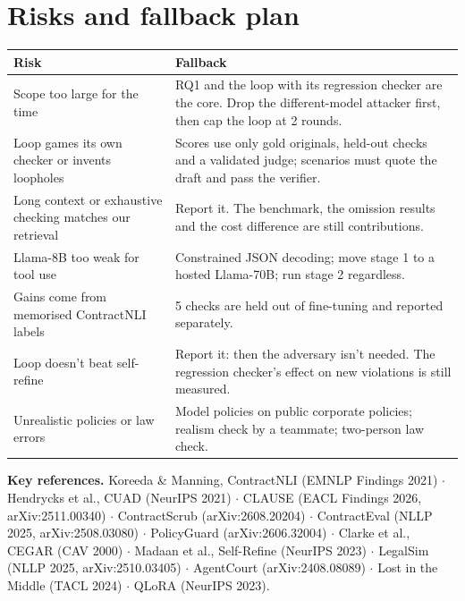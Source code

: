 \documentclass[11pt,a4paper]{article}
\begin{document}
\section{Risks and fallback plan}
\begin{table}[H]\small
\begin{tabularx}{\textwidth}{@{}LL@{}}
\toprule
\textbf{Risk} & \textbf{Fallback} \\
\midrule
Scope too large for the time & RQ1 and the loop with its regression checker are the core. Drop the different-model attacker first, then cap the loop at 2 rounds. \\
Loop games its own checker or invents loopholes & Scores use only gold originals, held-out checks and a validated judge; scenarios must quote the draft and pass the verifier. \\
Long context or exhaustive checking matches our retrieval & Report it. The benchmark, the omission results and the cost difference are still contributions. \\
Llama-8B too weak for tool use & Constrained JSON decoding; move stage 1 to a hosted Llama-70B; run stage 2 regardless. \\
Gains come from memorised ContractNLI labels & 5 checks are held out of fine-tuning and reported separately. \\
Loop doesn't beat self-refine & Report it: then the adversary isn't needed. The regression checker's effect on new violations is still measured. \\
Unrealistic policies or law errors & Model policies on public corporate policies; realism check by a teammate; two-person law check. \\
\bottomrule
\end{tabularx}
\end{table}

\vspace{-4pt}
{\scriptsize\textbf{Key references.} Koreeda \& Manning, ContractNLI (EMNLP Findings 2021) $\cdot$ Hendrycks et al., CUAD (NeurIPS 2021) $\cdot$ CLAUSE (EACL Findings 2026, arXiv:2511.00340) $\cdot$ ContractScrub (arXiv:2608.20204) $\cdot$ ContractEval (NLLP 2025, arXiv:2508.03080) $\cdot$ PolicyGuard (arXiv:2606.32004) $\cdot$ Clarke et al., CEGAR (CAV 2000) $\cdot$ Madaan et al., Self-Refine (NeurIPS 2023) $\cdot$ LegalSim (NLLP 2025, arXiv:2510.03405) $\cdot$ AgentCourt (arXiv:2408.08089) $\cdot$ Lost in the Middle (TACL 2024) $\cdot$ QLoRA (NeurIPS 2023).}
\end{document}
